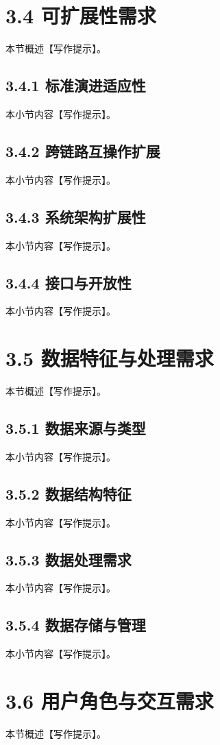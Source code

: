 \section{3.4 可扩展性需求}
本节概述【写作提示】。\cite{CJCS_Instructions_Library}
\subsection{3.4.1 标准演进适应性}
本小节内容【写作提示】。\cite{ASSIST_3011_2023}
\subsection{3.4.2 跨链路互操作扩展}
本小节内容【写作提示】。\cite{ASSIST_6020_2025}
\subsection{3.4.3 系统架构扩展性}
本小节内容【写作提示】。\cite{qin2013_gpssol}
\subsection{3.4.4 接口与开放性}
本小节内容【写作提示】。\cite{fried_loeliger1979_navigation}
\section{3.5 数据特征与处理需求}
本节概述【写作提示】。\cite{baruffa2013_jsps}
\subsection{3.5.1 数据来源与类型}
本小节内容【写作提示】。\cite{baek2016_jsac}
\subsection{3.5.2 数据结构特征}
本小节内容【写作提示】。\cite{baek2018_commag}
\subsection{3.5.3 数据处理需求}
本小节内容【写作提示】。\cite{jiang2019_sensors}
\subsection{3.5.4 数据存储与管理}
本小节内容【写作提示】。\cite{hegarty_1997_nav_interference}
\section{3.6 用户角色与交互需求}
本节概述【写作提示】。\cite{schnaufer_mcgraw_1997_waas}
